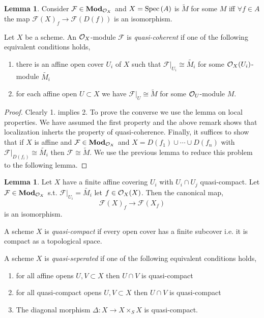 \documentclass[12pt]{extarticle}
\theoremstyle{definition}
\newtheorem{lemma}[theorem]{Lemma}
\newenvironment{definition}[1][Definition:]{\begin{trivlist}
\item[\hskip \labelsep {\bfseries #1}]}{\end{trivlist}}
\newcommand{\F}{\mathcal{F}}
\begin{document}
\begin{lemma}
Consider $\F \in \Mod{\struct{X}}$ and $X = \mathrm{Spec}\left(A\right)$ is $\widetilde{M}$ for some $M$ iff $\forall f \in A$ the map $\F(X)_f \to \F(D(f))$ is an isomorphism. 
\end{lemma}

\begin{definition}
Let $X$ be a scheme. An $\mathcal{O}_{X}$-module $\F$ is \textit{quasi-coherent} if one of the following equivalent conditions holds,
\begin{enumerate}
\item there is an affine open cover $U_i$ of $X$ such that $\F|_{U_i} \cong \widetilde{M_i}$ for some $\mathcal{O}_{X}(U_i)$-module $\widetilde{M_i}$
\item for each affine open $U \subset X$ we have $\F|_U \cong \widetilde{M}$ for some $\mathcal{O}_{U}$-module $M$. 
\end{enumerate}
\end{definition}

\begin{proof}
Clearly 1. implies 2. To prove the converse we use the lemma on local properties. We have assumed the first property and the above remark shows that localization inherts the property of quasi-coherence. Finally, it suffices to show that if $X$ is affine and $\F \in \Mod{\struct{X}}$ and $X = D(f_1) \cup \cdots \cup D(f_n)$ with $\F|_{D(f_i)} \cong \widetilde{M_i}$ then $\F \cong \widetilde{M}$. We use the previous lemma to reduce this problem to the following lemma. 
\end{proof}

\begin{lemma}
Let $X$ have a finite affine covering $U_i$ with $U_i \cap U_j$ quasi-compact. Let $\F \in \Mod{\struct{X}}$ s.t. $\F |_{U_i} = \widetilde{M_i}$ let $f \in \mathcal{O}_{X}(X)$. Then the canonical map,
\[ \F(X)_f \to \F(X_f) \]
is an isomorphism. 
\end{lemma}

\begin{definition}
A scheme $X$ is \textit{quasi-compact} if every open cover has a finite subcover i.e. it is compact as a topological space.
\end{definition}

\begin{definition}
A scheme $X$ is \textit{quasi-seperated} if one of the following equivalent conditions holds,
\begin{enumerate}
\item for all affine opens $U, V \subset X$ then $U \cap V$ is quasi-compact
\item for all quasi-compact opens $U, V \subset X$ then $U \cap V$ is quasi-compact
\item The diagonal morphism $\Delta : X \to X \times_S X$ is quasi-compact. 
\end{enumerate}
\end{definition}
\end{document}
